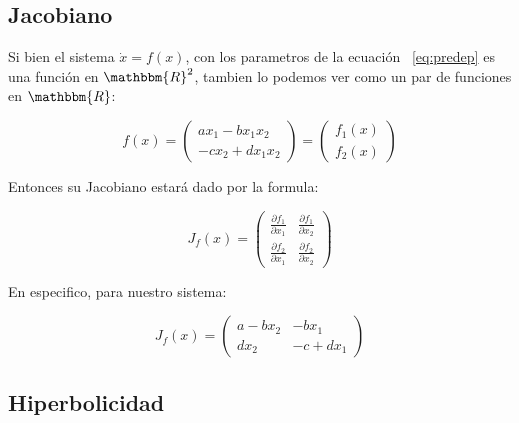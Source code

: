         \subsection{Jacobiano}

            Si bien el sistema $\dot{x} = f(x)$, con los parametros de la ecuación ~\ref{eq:predep} es una función en $\mathbbm{R}^2$, tambien lo podemos ver como un par de funciones en $\mathbbm{R}$:

            \begin{equation*}
                f(x) =
                \begin{pmatrix}
                    a x_1 - b x_1 x_2 \\
                    -c x_2 + d x_1 x_2
                \end{pmatrix} =
                \begin{pmatrix}
                    f_1(x) \\
                    f_2(x)
                \end{pmatrix}
            \end{equation*}

            Entonces su Jacobiano estará dado por la formula:

            \begin{equation}
                J_f(x) =
                \begin{pmatrix}
                    \frac{\partial f_1}{\partial x_1} & \frac{\partial f_1}{\partial x_2} \\
                    \frac{\partial f_2}{\partial x_1} & \frac{\partial f_2}{\partial x_2}
                \end{pmatrix}
            \end{equation}

            En especifico, para nuestro sistema:

            \begin{equation*}
                J_f(x) =
                \begin{pmatrix}
                    a - b x_2 & - b x_1 \\
                    d x_2 & - c + d x_1
                \end{pmatrix}
            \end{equation*}

        \subsection{Hiperbolicidad}


